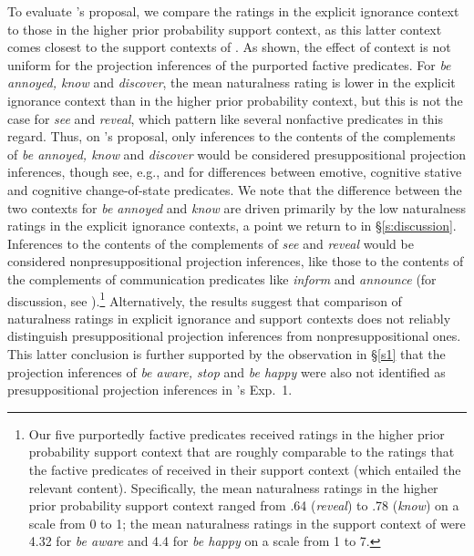 \documentclass[11pt,fleqn]{article}
\newcommand{\6}{\mbox{$[\hspace*{-.6mm}[$}}
\newcommand{\9}{\mbox{$]\hspace*{-.6mm}]$}}
\newcommand{\citepos}[1]{\citeauthor{#1}'s \citeyear{#1}}
\begin{document}
To evaluate \citepos{mandelkern-etal2020} proposal, we compare the ratings in the explicit ignorance context to those in the higher prior probability support context, as this latter context comes closest to the support contexts of \citealt{mandelkern-etal2020}. As shown, the effect of context is not uniform for the projection inferences of the purported factive predicates. For {\em be annoyed, know} and {\em discover}, the mean naturalness rating is lower in the explicit ignorance context than in the higher prior probability context, but this is not the case for {\em see} and {\em reveal}, which pattern like several nonfactive predicates in this regard. Thus, on \citepos{mandelkern-etal2020} proposal, only inferences to the contents of the complements of \emph{be annoyed, know} and \emph{discover} would be considered presuppositional projection inferences, though see, e.g., \citealt{karttunen2016} and \citealt{djaerv2019-thesis} for differences between emotive, cognitive stative and cognitive change-of-state predicates. We note that the difference between the two contexts for \emph{be annoyed} and \emph{know} are driven primarily by the low naturalness ratings in the explicit ignorance contexts, a point we return to in \S\ref{s:discussion}. Inferences to the contents of the complements of \emph{see} and \emph{reveal} would be considered nonpresuppositional projection inferences, like those to the contents of the complements of communication predicates like \emph{inform} and \emph{announce} (for discussion, see \citealt{anand-hacquard2014}).\footnote{Our five purportedly factive predicates received ratings in the higher prior probability support context that are roughly comparable to the ratings that the factive predicates of \citealt{mandelkern-etal2020} received in their support context (which entailed the relevant content). Specifically, the mean naturalness ratings in the higher prior probability support context ranged from .64 ({\em reveal}) to .78 ({\em know}) on a scale from 0 to 1; the mean naturalness ratings in the support context of \citealt{mandelkern-etal2020} were 4.32  for {\em be aware} and 4.4 for {\em be happy} on a scale from 1 to 7.} Alternatively, the results suggest that comparison of naturalness ratings in explicit ignorance and support contexts does not reliably distinguish presuppositional projection inferences from nonpresuppositional ones. This latter conclusion is further supported by the observation in \S\ref{s1} that  the projection inferences of \emph{be aware, stop} and \emph{be happy} were also not identified as presuppositional projection inferences in \citepos{kalomoiros-schwarz2024} Exp.~1.
\end{document}
